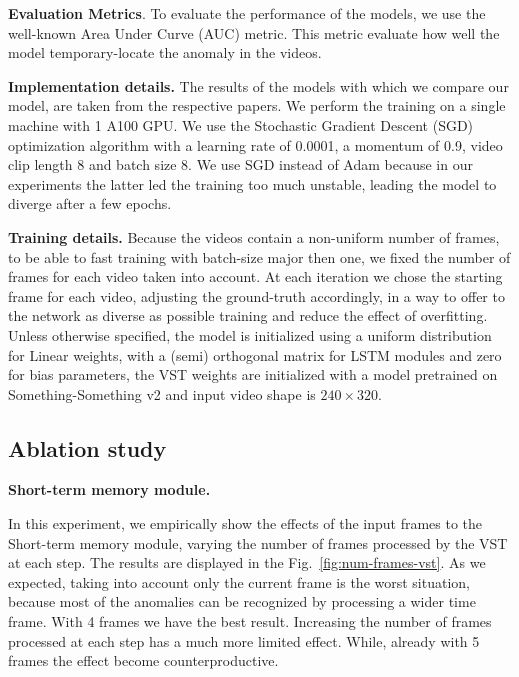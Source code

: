 \noindent\textbf{Evaluation Metrics}.
To evaluate the performance of the models, we use the well-known Area Under Curve (AUC) metric.
This metric evaluate how well the model temporary-locate the anomaly in the videos.

\noindent\textbf{Implementation details.}
The results of the models with which we compare our model, are taken from the respective papers.
We perform the training on a single machine with 1 A100 GPU.
We use the Stochastic Gradient Descent (SGD) optimization algorithm with a learning rate of 0.0001, a momentum of 0.9, video clip length 8 and batch size 8.
We use SGD instead of Adam because in our experiments the latter led the training too much unstable, leading the model to diverge after a few epochs.

\noindent\textbf{Training details.}
Because the videos contain a non-uniform number of frames, to be able to fast training with batch-size major then one, we fixed the number of frames for each video taken into account.
At each iteration we chose the starting frame for each video, adjusting the ground-truth accordingly, in a way to offer to the network as diverse as possible training and reduce the effect of overfitting.
Unless otherwise specified, the model is initialized using a uniform distribution for Linear weights, with a (semi) orthogonal matrix for LSTM modules and zero for bias parameters, the VST weights are initialized with a model pretrained on Something-Something v2 and input video shape is $240 \times 320$.

\subsection{Ablation study}


\noindent\textbf{Short-term memory module.}

In this experiment, we empirically show the effects of the input frames to the Short-term memory module, varying the number of frames processed by the VST at each step.
The results are displayed in the Fig.~\ref{fig:num-frames-vst}.
As we expected, taking into account only the current frame is the worst situation, because most of the anomalies can be recognized by processing a wider time frame.
With 4 frames we have the best result.
Increasing the number of frames processed at each step has a much more limited effect.
While, already with 5 frames the effect become counterproductive.

